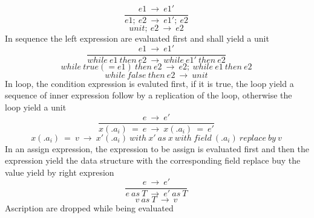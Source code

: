 \documentclass[10pt,a4paper]{article}
\begin{document}
\begin{equation}\frac{e1\ \rightarrow \ e1'}{e1;\ e2\ \rightarrow \ e1';\ e2}\ \tag{\ E-SEQ\ }\end{equation}
\begin{equation}unit;\ e2\ \rightarrow \ e2\ \tag{\ E-SEQNEXT\ }\end{equation}
In sequence the left expression are evaluated first and shall yield a unit
\begin{equation}\frac{e1\ \rightarrow \ e1'}{while\ e1\ then\ e2\ \rightarrow \ while\ e1'\ then\ e2}\ \tag{\ E-LOOP\ }\end{equation}
\begin{equation}while\ true(=e1)\ then\ e2\ \rightarrow \ e2;\ while\ e1\ then\ e2\ \tag{\ E-LOOPTRUE\ }\end{equation}
\begin{equation}while\ false\ then\ e2\ \rightarrow \ unit\ \tag{\ E-LOOPFALSE\ }\end{equation}
In loop, the condition expression is evaluted first, if it is true, the loop yield a sequence of inner expression follow by a replication of the loop, otherwise the loop yield a unit
\begin{equation}\frac{e\ \rightarrow \ e'}{x(.a_i)\ =\ e\ \rightarrow \ x(.a_i)\ =\ e'}\ \tag{\ E-ASSIGN\ }\end{equation}
\begin{equation}x(.a_i)\ =\ v\ \rightarrow \ x'(.a_i)\ with\ x'\ as\ x\ with\ field\ (.a_i)\ replace\ by\ v\ \tag{\ E-ASSIGN2\ }\end{equation}
In an assign expression, the expression to be assign is evaluated first and then the expression yield the data structure with the corresponding field replace buy the value yield by right expresion
\begin{equation}\frac{e\ \rightarrow \ e'}{e\ as\ T\ \rightarrow \ e'\ as\ T}\ \tag{\ E-ASCR1\ }\end{equation}
\begin{equation}v\ as\ T \ \rightarrow \ v\ \tag{\ E-ASCR2\ }\end{equation}  
Ascription are dropped while being evaluated
\end{document}
